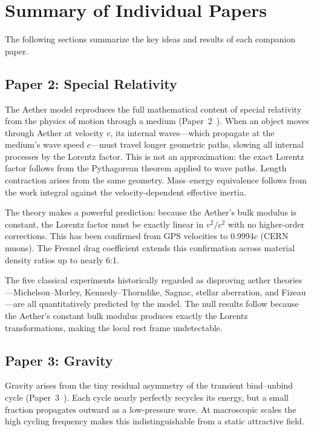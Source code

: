 \documentclass[12pt,letterpaper]{article}
\begin{document}
\section{Summary of Individual Papers}

The following sections summarize the key ideas and results of each companion paper.


\subsection{Paper 2: Special Relativity}

The Aether model reproduces the full mathematical content of special relativity from
the physics of motion through a medium (Paper~2~\cite{otto-relativity}).  When an
object moves through Aether at velocity $v$, its internal waves---which propagate at
the medium's wave speed $c$---must travel longer geometric paths, slowing all internal
processes by the Lorentz factor.  This is not an approximation: the exact Lorentz
factor follows from the Pythagorean theorem applied to wave paths.  Length contraction
arises from the same geometry.  Mass--energy equivalence follows from the work
integral against the velocity-dependent effective inertia.

The theory makes a powerful prediction: because the Aether's bulk modulus is constant,
the Lorentz factor must be exactly linear in $v^2/c^2$ with no higher-order corrections.
This has been confirmed from GPS velocities to 0.9994$c$ (CERN muons).  The Fresnel
drag coefficient extends this confirmation across material density ratios up to
nearly 6:1.

The five classical experiments historically regarded as disproving aether theories---Michelson--Morley,
Kennedy--Thorndike, Sagnac, stellar aberration, and Fizeau---are all quantitatively
predicted by the model.  The null results follow because the Aether's constant bulk
modulus produces exactly the Lorentz transformations, making the local rest frame
undetectable.


\subsection{Paper 3: Gravity}

Gravity arises from the tiny residual asymmetry of the transient bind--unbind cycle
(Paper~3~\cite{otto-gravity}).  Each cycle nearly perfectly recycles its energy, but a
small fraction propagates outward as a low-pressure wave.  At macroscopic scales the
high cycling frequency makes this indistinguishable from a static attractive field.
\end{document}
